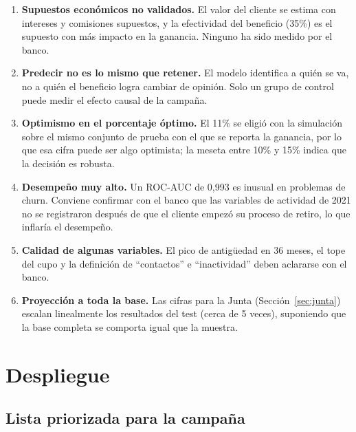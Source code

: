 \documentclass[11pt,a4paper]{article}
\begin{document}
\begin{enumerate}
  \item \textbf{Supuestos económicos no validados.} El valor del cliente se estima con intereses y comisiones supuestos, y la efectividad del beneficio (35\%) es el supuesto con más impacto en la ganancia. Ninguno ha sido medido por el banco.
  \item \textbf{Predecir no es lo mismo que retener.} El modelo identifica a quién se va, no a quién el beneficio logra cambiar de opinión. Solo un grupo de control puede medir el efecto causal de la campaña.
  \item \textbf{Optimismo en el porcentaje óptimo.} El 11\% se eligió con la simulación sobre el mismo conjunto de prueba con el que se reporta la ganancia, por lo que esa cifra puede ser algo optimista; la meseta entre 10\% y 15\% indica que la decisión es robusta.
  \item \textbf{Desempeño muy alto.} Un ROC-AUC de 0,993 es inusual en problemas de churn. Conviene confirmar con el banco que las variables de actividad de 2021 no se registraron después de que el cliente empezó su proceso de retiro, lo que inflaría el desempeño.
  \item \textbf{Calidad de algunas variables.} El pico de antigüedad en 36 meses, el tope del cupo y la definición de ``contactos'' e ``inactividad'' deben aclararse con el banco.
  \item \textbf{Proyección a toda la base.} Las cifras para la Junta (Sección~\ref{sec:junta}) escalan linealmente los resultados del test (cerca de 5 veces), suponiendo que la base completa se comporta igual que la muestra.
\end{enumerate}

\section{Despliegue}
\label{sec:despliegue}

\subsection{Lista priorizada para la campaña}
\end{document}
